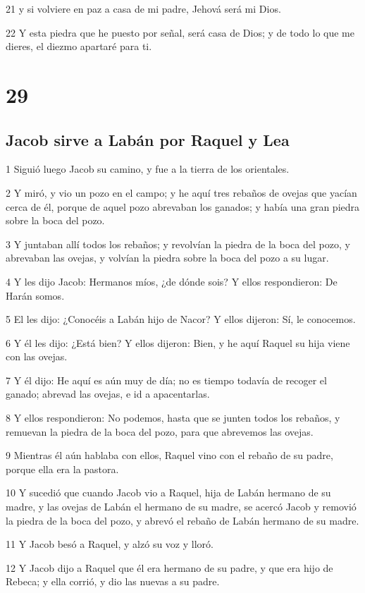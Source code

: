 21 y si volviere en paz a casa de mi padre, Jehová será mi Dios.

22 Y esta piedra que he puesto por señal, será casa de Dios; y de todo lo que me dieres, el diezmo apartaré para ti.

\chapter{29}

\section{Jacob sirve a Labán por Raquel y Lea}

1 Siguió luego Jacob su camino, y fue a la tierra de los orientales.

2 Y miró, y vio un pozo en el campo; y he aquí tres rebaños de ovejas que yacían cerca de él, porque de aquel pozo abrevaban los ganados; y había una gran piedra sobre la boca del pozo.

3 Y juntaban allí todos los rebaños; y revolvían la piedra de la boca del pozo, y abrevaban las ovejas, y volvían la piedra sobre la boca del pozo a su lugar.

4 Y les dijo Jacob: Hermanos míos, ¿de dónde sois? Y ellos respondieron: De Harán somos.

5 El les dijo: ¿Conocéis a Labán hijo de Nacor? Y ellos dijeron: Sí, le conocemos.

6 Y él les dijo: ¿Está bien? Y ellos dijeron: Bien, y he aquí Raquel su hija viene con las ovejas.

7 Y él dijo: He aquí es aún muy de día; no es tiempo todavía de recoger el ganado; abrevad las ovejas, e id a apacentarlas.

8 Y ellos respondieron: No podemos, hasta que se junten todos los rebaños, y remuevan la piedra de la boca del pozo, para que abrevemos las ovejas.

9 Mientras él aún hablaba con ellos, Raquel vino con el rebaño de su padre, porque ella era la pastora.

10 Y sucedió que cuando Jacob vio a Raquel, hija de Labán hermano de su madre, y las ovejas de Labán el hermano de su madre, se acercó Jacob y removió la piedra de la boca del pozo, y abrevó el rebaño de Labán hermano de su madre.

11 Y Jacob besó a Raquel, y alzó su voz y lloró.

12 Y Jacob dijo a Raquel que él era hermano de su padre, y que era hijo de Rebeca; y ella corrió, y dio las nuevas a su padre.

